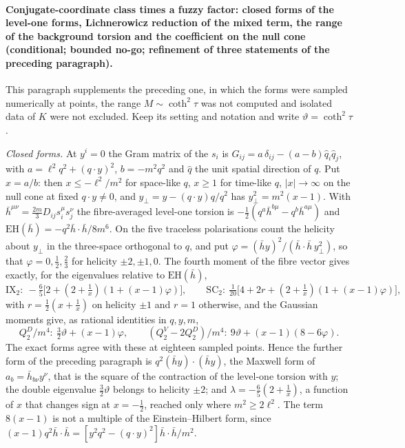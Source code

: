 \paragraph{Conjugate-coordinate class times a fuzzy factor: closed forms of the level-one forms, Lichnerowicz reduction of the mixed term, the range of the background torsion and the coefficient on the null cone (conditional; bounded no-go; refinement of three statements of the preceding paragraph).}
This paragraph supplements the preceding one, in which the forms were sampled numerically at points, the range \(M\sim\coth^2\tau\) was not computed and isolated data of \(K\) were not excluded. Keep its setting and notation and write \(\vartheta=\coth^2\tau\).

\emph{Closed forms.} At \(y^i=0\) the Gram matrix of the \(s_i\) is \(G_{ij}=a\,\delta_{ij}-(a-b)\hat q_i\hat q_j\), with \(a=\ell^2q^2+(q\cdot y)^2\), \(b=-m^2q^2\) and \(\hat q\) the unit spatial direction of \(q\). Put \(x=a/b\): then \(x\le-\ell^2/m^2\) for space-like \(q\), \(x\ge1\) for time-like \(q\), \(|x|\to\infty\) on the null cone at fixed \(q\cdot y\neq0\), and \(y_\perp=y-(q\cdot y)q/q^2\) has \(y_\perp^2=m^2(x-1)\). With \(\bar h^{\mu\nu}=\tfrac{2m}3D_{ij}s_i^\mu s_j^\nu\) the fibre-averaged level-one torsion is \(-\tfrac12(q^a\bar h^{b\mu}-q^b\bar h^{a\mu})\) and \(\mathrm{EH}(\bar h)=-q^2\bar h\cdot\bar h/8m^6\). On the five traceless polarisations count the helicity about \(y_\perp\) in the three-space orthogonal to \(q\), and put \(\varphi=(\bar hy)^2/(\bar h\cdot\bar h\,y_\perp^2)\), so that \(\varphi=0,\tfrac12,\tfrac23\) for helicity \(\pm2,\pm1,0\). The fourth moment of the fibre vector gives exactly, for the eigenvalues relative to \(\mathrm{EH}(\bar h)\),
\[
\mathrm{IX}_2:\ -\tfrac65\bigl[2+(2+\tfrac1x)(1+(x-1)\varphi)\bigr],\qquad
\mathrm{SC}_2:\ \tfrac1{20}\bigl[4+2r+(2+\tfrac1x)(1+(x-1)\varphi)\bigr],
\]
with \(r=\tfrac12(x+\tfrac1x)\) on helicity \(\pm1\) and \(r=1\) otherwise, and the Gaussian moments give, as rational identities in \(q,y,m\),
\[
Q_2^D/m^4:\ \tfrac32\vartheta+(x-1)\varphi,\qquad
(Q_2^V-2Q_2^D)/m^4:\ 9\vartheta+(x-1)(8-6\varphi).
\]
The exact forms agree with these at eighteen sampled points. Hence the further form of the preceding paragraph is \(q^2(\bar hy)\cdot(\bar hy)\), the Maxwell form of \(a_b=\bar h_{b\nu}y^\nu\), that is the square of the contraction of the level-one torsion with \(y\); the double eigenvalue \(\tfrac32\vartheta\) belongs to helicity \(\pm2\); and \(\lambda=-\tfrac65(2+\tfrac1x)\), a function of \(x\) that changes sign at \(x=-\tfrac12\), reached only where \(m^2\ge2\ell^2\). The term \(8(x-1)\) is not a multiple of the Einstein--Hilbert form, since \((x-1)q^2\bar h\cdot\bar h=[y^2q^2-(q\cdot y)^2]\bar h\cdot\bar h/m^2\).

